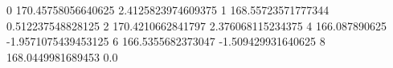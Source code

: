 0 170.45758056640625 2.4125823974609375
1 168.55723571777344 0.512237548828125
2 170.4210662841797 2.376068115234375
4 166.087890625 -1.9571075439453125
6 166.5355682373047 -1.509429931640625
8 168.0449981689453 0.0
